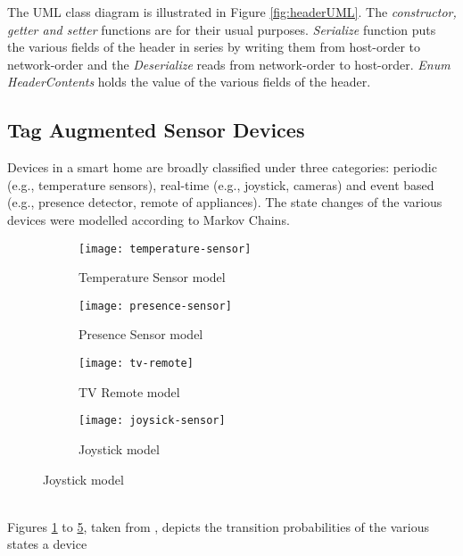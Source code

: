 The UML class diagram is illustrated in Figure \ref{fig:headerUML}. The \emph{
constructor, getter and setter} functions are for their usual purposes. \emph{
Serialize} function puts the various fields of the header in series by writing them
from host-order to network-order and the \emph{Deserialize} reads from network-order
to host-order. \emph{Enum HeaderContents} holds the value of the various fields of
the header.

\subsection{Tag Augmented Sensor Devices}
Devices in a smart home are broadly classified under three categories: periodic
(e.g., temperature sensors), real-time (e.g., joystick, cameras) and event based 
(e.g., presence detector, remote of appliances)\cite{Maselli}. The state changes
of the various devices were modelled according to Markov Chains\cite{Tolver}.\\
\begin{centering}
\begin{figure}[h!]
    \begin{subfigure}[b]{.5\textwidth}
        \centering
        \texttt{[image: temperature-sensor]}
        \caption{Temperature Sensor model}
        \label{fig:temperature-sensor}
    \end{subfigure}
    \begin{subfigure}[b]{.5\textwidth}
        \centering
        \texttt{[image: presence-sensor]}
        \caption{Presence Sensor model}
        \label{fig:presence-sensor}
    \end{subfigure}
    \begin{subfigure}[b]{.5\textwidth}
        \centering
        \texttt{[image: tv-remote]}
        \caption{TV Remote model}
        \label{fig:tv-remote}
    \end{subfigure}
    \begin{subfigure}[b]{.5\textwidth}
        \centering
        \texttt{[image: joysick-sensor]}
        \caption{Joystick model}
        \label{fig:joysick-sensor}
    \end{subfigure}
\end{figure}
\end{centering}\\
Figures \ref{fig:temperature-sensor} to \ref{fig:joysick-sensor}, taken from
\cite{Maselli}, depicts the transition probabilities of the various states a device
